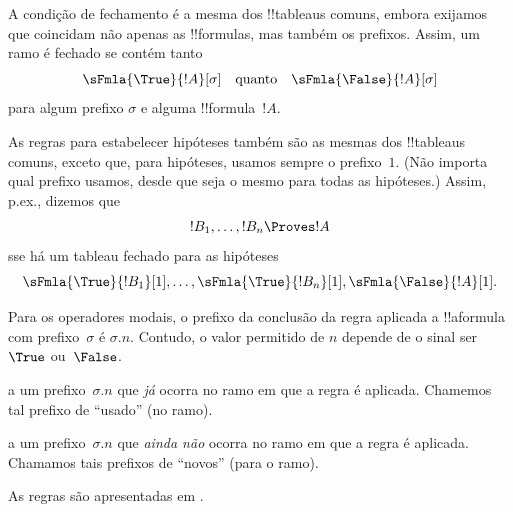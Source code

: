 \documentclass[../../../include/open-logic-section]{subfiles}
\begin{document}
A condição de fechamento é a mesma dos !!{tableau}s comuns, embora
exijamos que coincidam não apenas as !!{formula}s, mas também os
prefixos. Assim, um ramo é fechado se contém tanto
\[
\sFmla{\True}{!A}[\sigma] \quad\text{quanto}\quad \sFmla{\False}{!A}[\sigma]
\]
para algum prefixo $\sigma$ e alguma !!{formula}~$!A$.

As regras para estabelecer hipóteses também são as mesmas dos
!!{tableau}s comuns, exceto que, para hipóteses, usamos sempre o
prefixo~$1$. (Não importa qual prefixo usamos, desde que seja o mesmo
para todas as hipóteses.) Assim, p.ex., dizemos que
\[
!B_1, \dots, !B_n \Proves !A
\]
sse há um tableau fechado para as hipóteses
\[
\sFmla{\True}{!B_1}[1], \dots, \sFmla{\True}{!B_n}[1],
\sFmla{\False}{!A}[1].
\]

Para os operadores modais, o prefixo da
conclusão da regra aplicada a !!a{formula} com prefixo~$\sigma$ é
$\sigma.n$. Contudo, o valor permitido de $n$ depende de o sinal ser
~$\True$ ou~$\False$.

 a um prefixo~$\sigma.n$ que \emph{já} ocorra no ramo em que a regra é
aplicada. Chamemos tal prefixo de ``usado'' (no ramo).

 a um prefixo~$\sigma.n$ que \emph{ainda não} ocorra
no ramo em que a regra é aplicada. Chamamos tais prefixos de ``novos''
(para o ramo).

As regras são apresentadas em .
\end{document}
